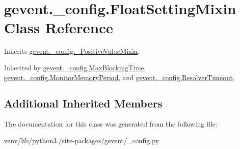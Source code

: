 \hypertarget{classgevent_1_1__config_1_1_float_setting_mixin}{}\section{gevent.\+\_\+config.\+Float\+Setting\+Mixin Class Reference}
\label{classgevent_1_1__config_1_1_float_setting_mixin}


Inherits \hyperlink{classgevent_1_1__config_1_1___positive_value_mixin}{gevent.\+\_\+config.\+\_\+\+Positive\+Value\+Mixin}.



Inherited by \hyperlink{classgevent_1_1__config_1_1_max_blocking_time}{gevent.\+\_\+config.\+Max\+Blocking\+Time}, \hyperlink{classgevent_1_1__config_1_1_monitor_memory_period}{gevent.\+\_\+config.\+Monitor\+Memory\+Period}, and \hyperlink{classgevent_1_1__config_1_1_resolver_timeout}{gevent.\+\_\+config.\+Resolver\+Timeout}.

\subsection*{Additional Inherited Members}


The documentation for this class was generated from the following file\+:\begin{DoxyCompactItemize}
\item 
venv/lib/python3./site-\/packages/gevent/\+\_\+config.\+py\end{DoxyCompactItemize}
